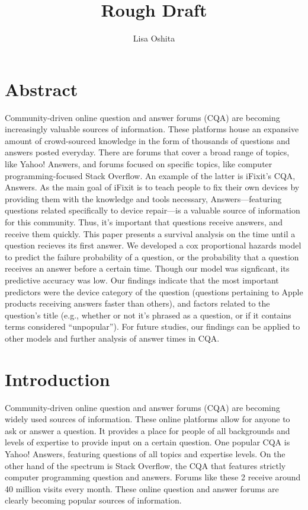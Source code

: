 \documentclass[12pt]{article}
\title{Rough Draft}
\author{Lisa Oshita}
\date{}
\begin{document}
\maketitle

\section{Abstract}

Community-driven online question and answer forums (CQA) are becoming increasingly valuable sources of information. These platforms house an expansive amount of crowd-sourced knowledge in the form of thousands of questions and answers posted everyday. There are forums that cover a broad range of topics, like Yahoo! Answers, and forums focused on specific topics, like computer programming-focused Stack Overflow. An example of the latter is iFixit's CQA, Answers. As the main goal of iFixit is to teach people to fix their own devices by providing them with the knowledge and tools necessary, Answers---featuring questions related specifically to device repair---is a valuable source of information for this community. Thus, it's important that questions receive answers, and receive them quickly. This paper presents a survival analysis on the time until a question recieves its first answer. We developed a cox proportional hazards model to predict the failure probability of a question, or the probability that a question receives an answer before a certain time. Though our model was signficant, its predictive accuracy was low. Our findings indicate that the most important predictors were the device category of the question (questions pertaining to Apple products receiving answers faster than others), and factors related to the question's title (e.g., whether or not it's phrased as a question, or if it contains terms considered ``unpopular''). For future studies, our findings can be applied to other models and further analysis of answer times in CQA. 

\section{Introduction}

    Community-driven online question and answer forums (CQA) are becoming widely used sources of information. These online platforms allow for anyone to ask or answer a question. It provides a place for people of all backgrounds and levels of expertise to provide input on a certain question. One popular CQA is Yahoo! Answers, featuring questions of all topics and expertise levels. On the other hand of the spectrum is Stack Overflow, the CQA that features strictly computer programming question and answers. Forums like these 2 receive around 40 million visits every month. These online question and answer forums are clearly becoming popular sources of information. 
    
\end{document}
